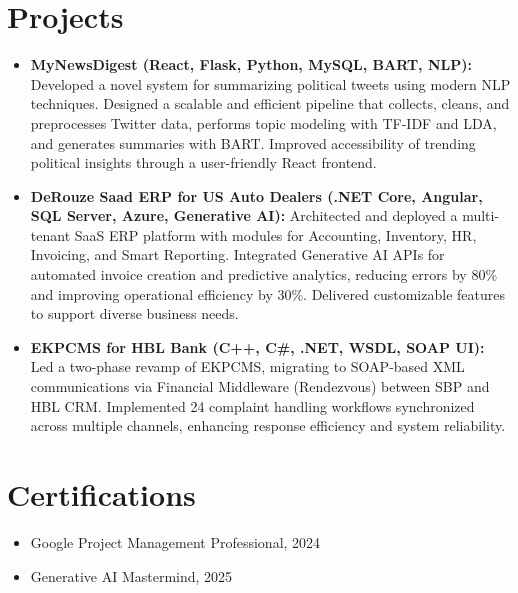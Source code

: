 \documentclass[letterpaper,10pt]{article}
\begin{document}
\section{Projects}
\begin{itemize}
    \setlength\itemsep{3pt}
    \item \textbf{MyNewsDigest (React, Flask, Python, MySQL, BART, NLP):} Developed a novel system for summarizing political tweets using modern NLP techniques. Designed a scalable and efficient pipeline that collects, cleans, and preprocesses Twitter data, performs topic modeling with TF-IDF and LDA, and generates summaries with BART. Improved accessibility of trending political insights through a user-friendly React frontend.
    \item \textbf{DeRouze Saad ERP for US Auto Dealers (.NET Core, Angular, SQL Server, Azure, Generative AI): } Architected and deployed a multi-tenant SaaS ERP platform with modules for Accounting, Inventory, HR, Invoicing, and Smart Reporting. Integrated Generative AI APIs for automated invoice creation and predictive analytics, reducing errors by 80\% and improving operational efficiency by 30\%. Delivered customizable features to support diverse business needs.
    \item \textbf{EKPCMS for HBL Bank (C++, C\#, .NET, WSDL, SOAP UI):} Led a two-phase revamp of EKPCMS, migrating to SOAP-based XML communications via Financial Middleware (Rendezvous) between SBP and HBL CRM. Implemented 24 complaint handling workflows synchronized across multiple channels, enhancing response efficiency and system reliability.
\end{itemize}

\section{Certifications}
\begin{itemize}
    \item Google Project Management Professional, 2024
    \item Generative AI Mastermind, 2025
\end{itemize}

\vspace*{\fill}
\end{document}
